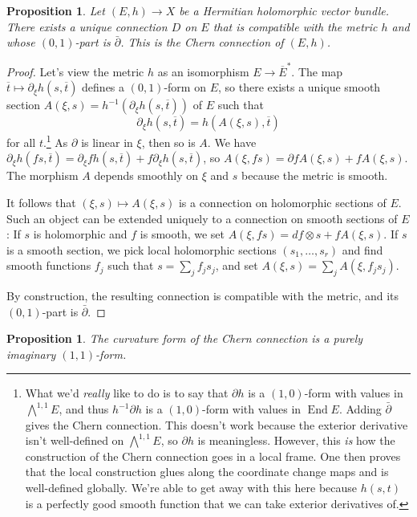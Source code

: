 \documentclass[10pt,a4paper]{article}
\newtheorem{prop}[theo]{Proposition}
\newtheorem*{proof}{Proof}
\def\ov#1{\overline{#1}}
\DeclareMathOperator{\End}{End}
\begin{document}
\begin{prop}
Let $(E, h) \to X$ be a Hermitian holomorphic vector bundle. There exists a unique connection $D$ on $E$ that is compatible with the metric $h$ and whose $(0,1)$-part is $\bar\partial$. This is the \emph{Chern connection} of $(E,h)$.
\end{prop}

\begin{proof}
Let's view the metric $h$ as an isomorphism $E \to \overline E^*$. The map $\ov t \mapsto \partial_\xi h(s, \ov t)$ defines a $(0,1)$-form on $E$, so there exists a unique smooth section $A(\xi,s) = h^{-1}(\partial_\xi h(s, \ov t))$ of $E$ such that
\[
\partial_\xi h(s, \ov t) = h(A(\xi, s), \ov t)
\]
for all $t$.\footnote{What we'd \emph{really} like to do is to say that $\partial h$ is a $(1,0)$-form with values in $\bigwedge^{1,1}E$, and thus $h^{-1}\partial h$ is a $(1,0)$-form with values in $\End E$. Adding $\bar\partial$ gives the Chern connection. This doesn't work because the exterior derivative isn't well-defined on $\bigwedge^{1,1}E$, so $\partial h$ is meaningless. However, this \emph{is} how the construction of the Chern connection goes in a local frame. One then proves that the local construction glues along the coordinate change maps and is well-defined globally. We're able to get away with this here because $h(s,t)$ is a perfectly good smooth function that we can take exterior derivatives of.}
As $\partial$ is linear in $\xi$, then so is $A$. We have $\partial_\xi h(f s, \ov t) = \partial_\xi f h(s,\ov t) + f \partial_\xi h(s, \ov t)$, so $A(\xi, fs) = \partial f A(\xi, s) + f A(\xi, s)$. The morphism $A$ depends smoothly on $\xi$ and $s$ because the metric is smooth.

It follows that $(\xi, s) \mapsto A(\xi, s)$ is a connection on holomorphic sections of $E$. Such an object can be extended uniquely to a connection on smooth sections of $E$: If $s$ is holomorphic and $f$ is smooth, we set $A(\xi, f s) = df \otimes s + f A(\xi, s)$. If $s$ is a smooth section, we pick local holomorphic sections $(s_1, \ldots, s_r)$ and find smooth functions $f_j$ such that $s = \sum_j f_j s_j$, and set $A(\xi,s) = \sum_j A(\xi, f_j s_j)$.

By construction, the resulting connection is compatible with the metric, and its $(0,1)$-part is $\bar\partial$.
\end{proof}


\begin{prop}
The curvature form of the Chern connection is a purely imaginary $(1,1)$-form.
\end{prop}
\end{document}
